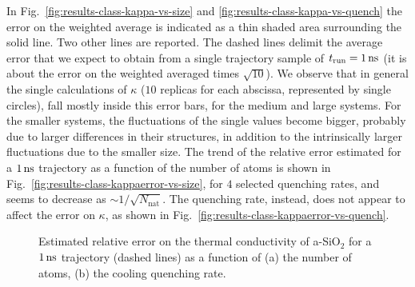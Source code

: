 In Fig.~\ref{fig:results-class-kappa-vs-size} and \ref{fig:results-class-kappa-vs-quench} the error on the weighted average is indicated as a thin shaded area surrounding the solid line. Two other lines are reported. The dashed lines delimit the average error that we expect to obtain from a single trajectory sample of $t_{\mathrm{run}}=1\,\mathrm{ns}$ (it is about the error on the weighted averaged times $\sqrt{10}$). 
We observe that in general the single calculations of $\kappa$ ($10$ replicas for each abscissa, represented by single circles), fall mostly inside this error bars, for the medium and large systems. For the smaller systems, the fluctuations of the single values become bigger, probably due to larger differences in their structures, in addition to the intrinsically larger fluctuations due to the smaller size. 
The trend of the relative error estimated for a $1\,\mathrm{ns}$ trajectory as a function of the number of atoms is shown in Fig.~\ref{fig:results-class-kappaerror-vs-size}, for $4$ selected quenching rates, and seems to decrease as $\sim 1/\sqrt{N_\mathrm{nat}}$. 
The quenching rate, instead, does not appear to affect the error on $\kappa$, as shown in Fig.~\ref{fig:results-class-kappaerror-vs-quench}. 

\begin{figure}[!tb]
    \centering
    \hfill
    \caption{Estimated relative error on the thermal conductivity of a-SiO$_2$ for a $1\,\mathrm{ns}$ trajectory (dashed lines) as a function of (a) the number of atoms, (b) the cooling quenching rate. 
    }
    \label{fig:results-class-kappaerror}
\end{figure}


